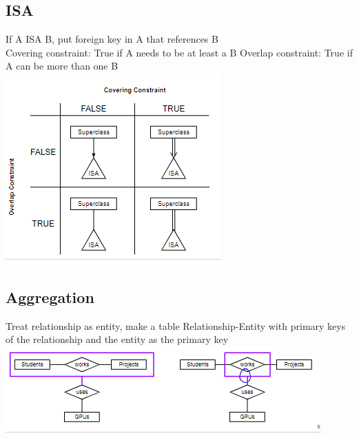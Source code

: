 \documentclass{article}
\begin{document}
\begin{multicols*}{2}
    \subsection*{ISA}
    If A ISA B, put foreign key in A that references B\\
    Covering constraint: True if A needs to be at least a B
    Overlap constraint: True if A can be more than one B\\
    \includegraphics{ISA constraints.png}
    \subsection*{Aggregation}
    Treat relationship as entity, make a table Relationship-Entity with primary keys of the relationship and the entity as the primary key\\
    \includegraphics{aggregation.png}
\end{multicols*}
\end{document}
